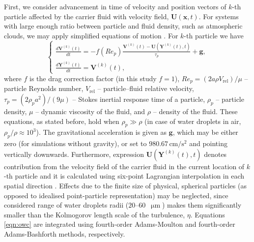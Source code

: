 \documentclass{pracamgren}
\begin{document}
First, we consider advancement in time of velocity and position vectors of $k$-th particle affected by the carrier fluid with velocity field, $\mathbf{U}(\mathbf{x}, t)$.
For systems with large enough ratio between particle and fluid density, such as atmospheric clouds, we may apply simplified equations of motion \parencite{Maxey1983}.
For $k$-th particle we have
\begin{equation}
  \left\{
  \begin{array}{ll}
  \frac{d \mathbf{V}^{(k)}(t)}{d t} = - f (Re_p) \frac{ \mathbf{V}^{(k)}(t) - \mathbf{U}(\mathbf{Y}^{(k)}(t), t) }{\tau_{p}} + \mathbf{g} ,\\
  \frac{d \mathbf{Y}^{(k)}(t)}{d t} = \mathbf{V}^{(k)}(t) ,
  \end{array}
  \right.
  \label{eqn:owc}
\end{equation}
where $f$ is the drag correction factor (in this study $f = 1$), $Re_p = (2 a \rho V_{\text{rel}}) / \mu $ -- particle Reynolds number, $V_{\text{rel}}$ -- particle--fluid relative velocity, $\tau_{p} = (2 \rho_{p} a^{2}) / (9 \mu)$ -- Stokes inertial response time of a particle, $\rho_{p}$ -- particle density, $\mu$ -- dynamic viscosity of the fluid, and $\rho$ -- density of the fluid.
These equations, as stated before, hold when $\rho_p \gg \rho$ (in case of water droplets in air, $\rho_p / \rho \approx 10^3$). 
The gravitational acceleration is given as $\mathbf{g}$, which may be either zero (for simulations without gravity), or set to $980.67 \, \text{cm} / \text{s}^{2}$ and pointing vertically downwards. 
Furthermore, expression $\mathbf{U}(\mathbf{Y}^{(k)}(t), t)$ denotes contribution from the velocity field of the carrier fluid in the current location of $k$-th particle and it is calculated using six-point Lagrangian interpolation in each spatial direction \parencite{Ayala2014}.
Effects due to the finite size of physical, spherical particles (as opposed to idealised point-particle representation) may be neglected, since considered range of water droplets radii ($20$--$60$~$\upmu\text{m}$) makes them significantly smaller than the Kolmogorov length scale of the turbulence, $\eta$. 
Equations \ref{eqn:owc} are integrated using fourth-order Adams-Moulton and fourth-order Adams-Bashforth methods, respectively.
\end{document}
